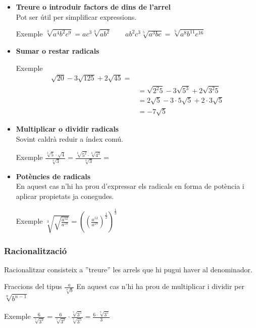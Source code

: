 \documentclass{beamer}
\begin{document}
\begin{frame}
\begin{itemize}
\item
\textbf{Treure o introduir factors de dins de l'arrel}\\
Pot ser útil per simplificar expressions.\pause
\begin{exampleblock}{Exemple}
$\sqrt[3]{a^{4}b^{2}c^{9}}=ac^{3}\sqrt[3]{ab^{2}}\qquad
ab^{2}c^{3}\sqrt[5]{a^{3}bc}=\sqrt[5]{a^{8}b^{11}c^{16}}$
\end{exampleblock}\pause
\item
\textbf{Sumar o restar radicals}
\begin{exampleblock}{Exemple}
\begin{align*}
\sqrt{20}-3\sqrt{125}+2\sqrt{45}=&\\
&=\sqrt{2^{2}5}-3\sqrt{5^{3}}+2\sqrt{3^{2}5}\\
&=2\sqrt{5}-3\cdot5\sqrt{5}+2\cdot3\sqrt{5}\\
&=-7\sqrt{5}
\end{align*}
\end{exampleblock}
\end{itemize}
\end{frame}
\begin{frame}
\begin{itemize}
\item
\textbf{Multiplicar o dividir radicals}\\
Sovint caldrà reduir a índex comú.\pause
\begin{exampleblock}{Exemple}
$\frac{\sqrt[3]{5}\cdot\sqrt{4}}{\sqrt[4]{3}}=\frac{\sqrt[6]{5^{2}}\cdot\sqrt[6]{4^{3}}}{\sqrt[4]{3}}=$
\end{exampleblock}\pause
\item
\textbf{Potències de radicals}\\
En aquest cas n'hi ha prou d'expressar els radicals en forma de
potència i aplicar propietats ja conegudes.\pause

\begin{exampleblock}{Exemple}
$\sqrt[3]{\sqrt{\frac{a^{12}}{a^{18}}}}=
\left(\left(\frac{a^{12}}{a^{18}}\right)^{\frac{1}{2}}\right)^{\frac{1}{3}}$
\end{exampleblock}
\end{itemize}
\end{frame}
\begin{frame}\frametitle{Racionalització}
Racionalitzar consisteix a ''treure'' les arrels que hi pugui
haver al denominador.\pause
\begin{block}{Fraccions del tipus $\frac{a}{\sqrt[n]{b}}$}
En aquest cas n'hi ha prou de multiplicar i dividir per
$\sqrt[n]{b^{n-1}}$
\end{block}\pause
\begin{exampleblock}{Exemple}
$\frac{6}{\sqrt[7]{3^{2}}}=\frac{6}{\sqrt[7]{3^{2}}}\cdot\frac{\sqrt[7]{3^{5}}}{\sqrt[7]{3^{5}}}=\frac{6\cdot\sqrt[7]{3^{5}}}{3}$
\end{exampleblock}
\end{frame}
\end{document}
